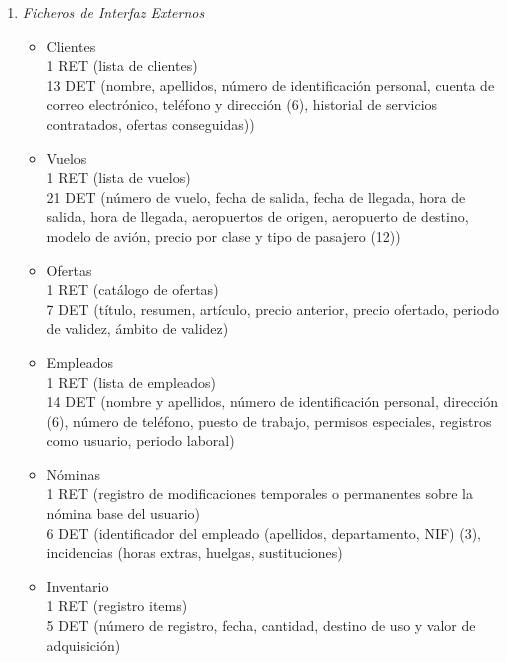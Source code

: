 
\begin{enumerate}
	\item \textit{Ficheros de Interfaz Externos}

		\begin{itemize}
			\item Clientes \\
			1 RET (lista de clientes)\\
			13 DET (nombre, apellidos, número de identificación personal, cuenta de correo electrónico, teléfono y dirección (6),
			historial de servicios contratados, ofertas conseguidas))\\
			\item Vuelos \\
			1 RET (lista de vuelos)\\
			21 DET (número de vuelo, fecha de salida, fecha de llegada, hora de salida, hora de llegada, aeropuertos de origen,
			aeropuerto de destino, modelo de avión, precio por clase y tipo de pasajero (12))\\
			\item Ofertas \\
			1 RET (catálogo de ofertas)\\
			7 DET (título, resumen, artículo, precio anterior, precio ofertado, periodo de validez, ámbito de validez)\\
			\item Empleados \\
			1 RET (lista de empleados)\\
			14 DET (nombre y apellidos, número de identificación personal, dirección (6), número de teléfono, puesto de trabajo,
			permisos especiales, registros como usuario, periodo laboral)\\
			\item Nóminas \\
			1 RET (registro de modificaciones temporales o permanentes sobre la nómina base del usuario)\\
			6 DET (identificador del empleado (apellidos, departamento, NIF) (3), incidencias (horas extras, huelgas, sustituciones)\\
			\item Inventario \\
			1 RET (registro items)\\
			5 DET (número de registro, fecha, cantidad, destino de uso y valor de adquisición)\\

\end{itemize}
\end{enumerate}
